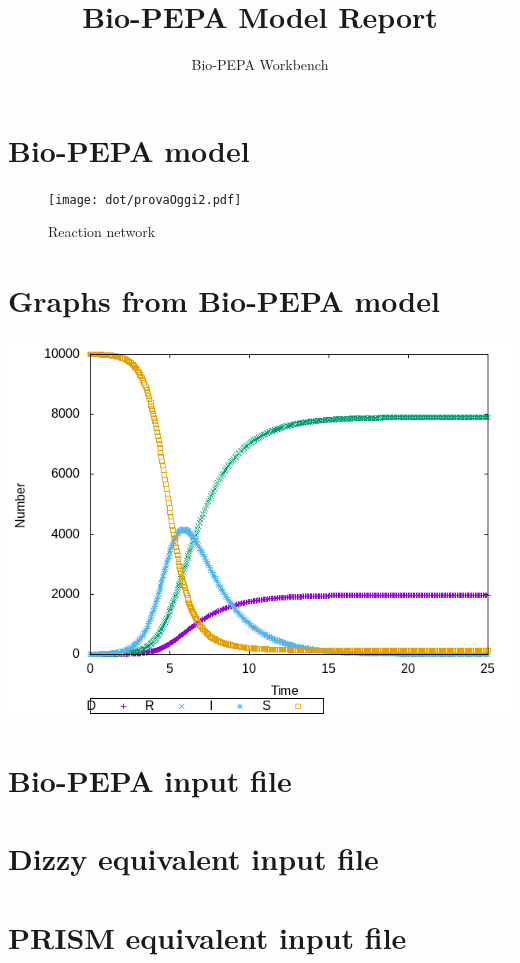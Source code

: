 \documentclass{llncs}
\title{Bio-PEPA Model Report}
\author{Bio-PEPA Workbench}
\institute{\today}
\begin{document}
\maketitle
\section{Bio-PEPA model}

\begin{figure}[htbp]
\begin{center}
\texttt{[image: dot/provaOggi2.pdf]}
\caption{Reaction network}
\end{center}
\end{figure}
\newpage
\section{Graphs from Bio-PEPA model}
\includegraphics[scale=0.5]{png/provaOggi2001_sundials_results_0}
\appendix
\newpage
\section{Bio-PEPA input file}

\newpage
\section{Dizzy equivalent input file}

\newpage
\section{PRISM equivalent input file}

\end{document}
